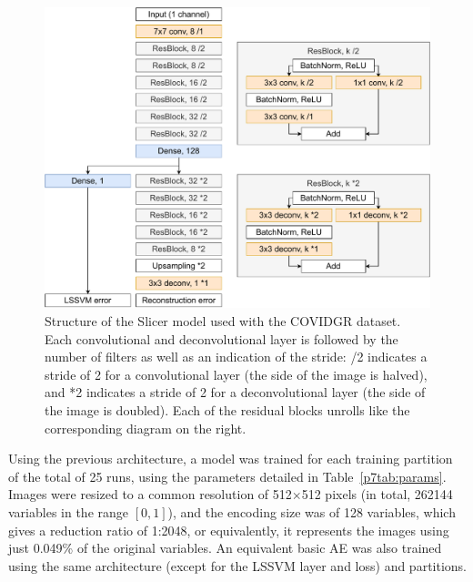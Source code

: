 \begin{figure}[htbp]
    \centering
    \includegraphics[width=.9\linewidth]{slicercovid.pdf}
    \caption{Structure of the Slicer model used with the COVIDGR dataset. Each convolutional and deconvolutional layer is followed by the number of filters as well as an indication of the stride: /2 indicates a stride of 2 for a convolutional layer (the side of the image is halved), and *2 indicates a stride of 2 for a deconvolutional layer (the side of the image is doubled). Each of the residual blocks unrolls like the corresponding diagram on the right.}
    \label{p7fig:architecture}
\end{figure}

Using the previous architecture, a model was trained for each training partition of the total of 25 runs, using the parameters detailed in Table~\ref{p7tab:params}. Images were resized to a common resolution of 512$\times$512 pixels (in total, 262144 variables in the range $[0,1]$), and the encoding size was of 128 variables, which gives a reduction ratio of 1:2048, or equivalently, it represents the images using just 0.049\% of the original variables. An equivalent basic AE was also trained using the same architecture (except for the LSSVM layer and loss) and partitions.

